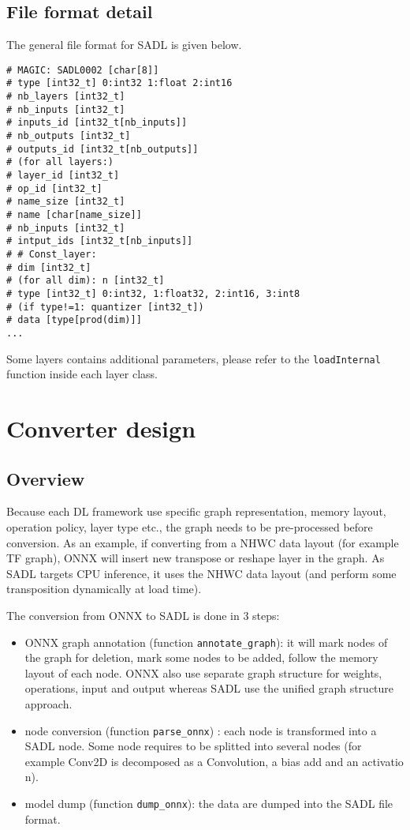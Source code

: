 \documentclass[10pt,a4paper]{article}
\begin{document}
\subsection{File format detail}
The general file format for SADL is given below.
\begin{lstlisting}[caption={SADL format conversion},style=code]
# MAGIC: SADL0002 [char[8]] 
# type [int32_t] 0:int32 1:float 2:int16 
# nb_layers [int32_t] 
# nb_inputs [int32_t] 
# inputs_id [int32_t[nb_inputs]] 
# nb_outputs [int32_t] 
# outputs_id [int32_t[nb_outputs]] 
# (for all layers:) 
# layer_id [int32_t] 
# op_id [int32_t] 
# name_size [int32_t] 
# name [char[name_size]] 
# nb_inputs [int32_t] 
# intput_ids [int32_t[nb_inputs]] 
# # Const_layer: 
# dim [int32_t] 
# (for all dim): n [int32_t] 
# type [int32_t] 0:int32, 1:float32, 2:int16, 3:int8 
# (if type!=1: quantizer [int32_t]) 
# data [type[prod(dim)]] 
...
\end{lstlisting}
Some layers contains additional parameters, please refer to the \texttt{loadInternal} function inside each layer class.




\section{Converter design}
\subsection{Overview}
Because each DL framework use specific graph representation, memory layout, operation policy, layer type etc., the graph needs to be pre-processed before conversion. As an example, if converting from a NHWC data layout (for example TF graph), ONNX will insert new transpose or reshape layer in the graph.
As SADL targets CPU inference, it uses the NHWC data layout (and perform some transposition dynamically at load time).

The conversion from ONNX to SADL is done in 3 steps:
\begin{itemize}
\item ONNX graph annotation (function \texttt{annotate\_graph}): it will mark nodes of the graph for deletion, mark some nodes to be added, follow the memory layout of each node. ONNX also use separate graph structure for weights, operations, input and output whereas SADL use the unified graph structure approach.
\item node conversion (function \texttt{parse\_onnx}) : each node is transformed into a SADL node. Some node requires to be splitted into several nodes (for example Conv2D is decomposed as a Convolution, a bias add and an activatio n).
\item model dump (function \texttt{dump\_onnx}): the data are dumped into the SADL file format.
\end{itemize}
\end{document}
